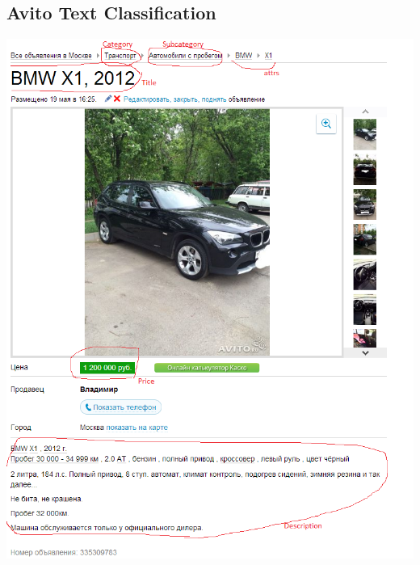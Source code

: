 \documentclass{beamer}
\begin{document}
	\subsection{Avito Text Classification}
	\begin{frame}
		\begin{center}
			\includegraphics[scale=0.3]{img/avito}
		\end{center}
	\end{frame}
\end{document}
